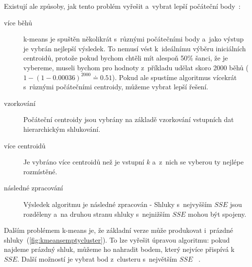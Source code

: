 Existují ale způsoby, jak tento problém vyřešit a~vybrat lepší počáteční body~\cite{Tan05}:
\begin{description}
\item[více běhů] k-means je spuštěn několikrát s~různými počátečními body a~jako výstup je vybrán nejlepší výsledek. To nemusí vést k~ideálnímu výběru iniciálních centroidů, protože pokud bychom chtěli mít alespoň 50\% šanci, že je vybereme, museli bychom pro hodnoty z~příkladu udělat skoro 2000 běhů ($1 - (1 - 0.00036)^2000 \doteq 0.51$). Pokud ale spustíme algoritmus vícekrát s~různými počátečními centroidy, můžeme vybrat lepší řešení.
\item[vzorkování] Počáteční centroidy jsou vybrány na základě vzorkování vstupních dat hierarchickým shlukování.
\item[více centroidů] Je vybráno více centroidů než je vstupní $k$ a~z~nich se vyberou ty nejlépe rozmístěné.
\item[následné zpracování] Výsledek algoritmu je následné zpracován - Shluky s~nej\-vyš\-ším $SSE$ jsou rozděleny a~na druhou stranu shluky s~nejnižším $SSE$ mohou být spojeny.
\end{description} 

Dalším problémem k-means je, že základní verze může produkovat i~prázdné shluky~(\autoref{fig:kmeansemptycluster}). To lze vyřešit úpravou algoritmu: pokud najdeme prázdný shluk, můžeme ho nahradit bodem, který nejvíce přispívá k~$SSE$. Další možností je vybrat bod z~clusteru s~největším $SSE$ ~\cite{Tan05}.\\

